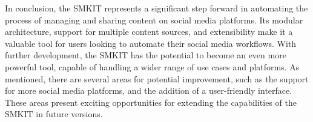 In conclusion, the SMKIT represents a significant step forward in automating the process of managing and sharing content on social media platforms. Its modular architecture, support for multiple content sources, and extensibility make it a valuable tool for users looking to automate their social media workflows. With further development, the SMKIT has the potential to become an even more powerful tool, capable of handling a wider range of use cases and platforms. As mentioned, there are several areas for potential improvement, such as the support for more social media platforms, and the addition of a user-friendly interface. These areas present exciting opportunities for extending the capabilities of the SMKIT in future versions.
